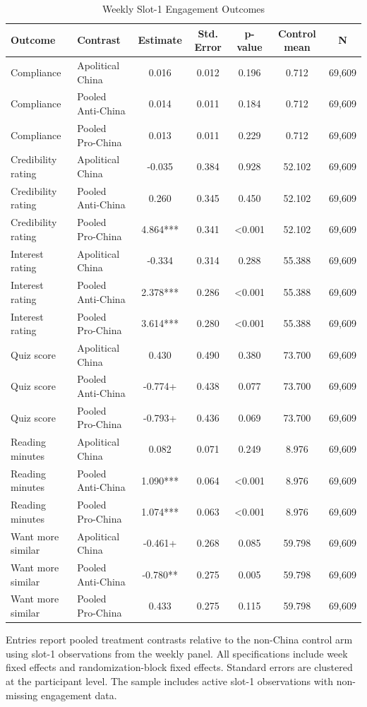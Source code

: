 \begin{table}[H]
\centering
\caption{Weekly Slot-1 Engagement Outcomes}
\label{tab:weekly_panel_slot1}
\footnotesize
\begin{threeparttable}
\begin{tabular}{llccccc}
\toprule
Outcome & Contrast & Estimate & Std. Error & p-value & Control mean & N \\
\midrule
Compliance & Apolitical China & 0.016 & 0.012 & 0.196 & 0.712 & 69,609 \\
Compliance & Pooled Anti-China & 0.014 & 0.011 & 0.184 & 0.712 & 69,609 \\
Compliance & Pooled Pro-China & 0.013 & 0.011 & 0.229 & 0.712 & 69,609 \\
Credibility rating & Apolitical China & -0.035 & 0.384 & 0.928 & 52.102 & 69,609 \\
Credibility rating & Pooled Anti-China & 0.260 & 0.345 & 0.450 & 52.102 & 69,609 \\
Credibility rating & Pooled Pro-China & 4.864*** & 0.341 & <0.001 & 52.102 & 69,609 \\
Interest rating & Apolitical China & -0.334 & 0.314 & 0.288 & 55.388 & 69,609 \\
Interest rating & Pooled Anti-China & 2.378*** & 0.286 & <0.001 & 55.388 & 69,609 \\
Interest rating & Pooled Pro-China & 3.614*** & 0.280 & <0.001 & 55.388 & 69,609 \\
Quiz score & Apolitical China & 0.430 & 0.490 & 0.380 & 73.700 & 69,609 \\
Quiz score & Pooled Anti-China & -0.774+ & 0.438 & 0.077 & 73.700 & 69,609 \\
Quiz score & Pooled Pro-China & -0.793+ & 0.436 & 0.069 & 73.700 & 69,609 \\
Reading minutes & Apolitical China & 0.082 & 0.071 & 0.249 & 8.976 & 69,609 \\
Reading minutes & Pooled Anti-China & 1.090*** & 0.064 & <0.001 & 8.976 & 69,609 \\
Reading minutes & Pooled Pro-China & 1.074*** & 0.063 & <0.001 & 8.976 & 69,609 \\
Want more similar & Apolitical China & -0.461+ & 0.268 & 0.085 & 59.798 & 69,609 \\
Want more similar & Pooled Anti-China & -0.780** & 0.275 & 0.005 & 59.798 & 69,609 \\
Want more similar & Pooled Pro-China & 0.433 & 0.275 & 0.115 & 59.798 & 69,609 \\
\bottomrule
\end{tabular}
\begin{tablenotes}[flushleft]
\footnotesize
\item Entries report pooled treatment contrasts relative to the non-China control arm using slot-1 observations from the weekly panel. All specifications include week fixed effects and randomization-block fixed effects. Standard errors are clustered at the participant level. The sample includes active slot-1 observations with non-missing engagement data.
\end{tablenotes}
\end{threeparttable}
\end{table}
